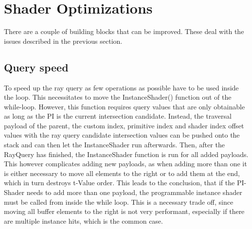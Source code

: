 \section{Shader Optimizations}
There are a couple of building blocks that can be improved. These deal with the issues described in the previous section.
\subsection{Query speed}
\label{sec:OptQuerySpeed}
To speed up the ray query as few operations as possible have to be used inside the loop. This necessitates to move the InstanceShader() function out of the while-loop. However, this function requires query values that are only obtainable as long as the PI is the current intersection candidate. Instead, the traversal payload of the parent, the custom index, primitive index and shader index offset values with the ray query candidate intersection values can be pushed onto the stack and can then let the InstanceShader run afterwards.
Then, after the RayQuery has finished, the InstanceShader function is run for all added payloads. This however complicates adding new payloads, as when adding more than one it is either necessary to move all elements to the right or to add them at the end, which in turn destroys t-Value order. This leads to the conclusion, that if the PI-Shader needs to add more than one payload, the programmable instance shader must be called from inside the while loop. This is a necessary trade off, since moving all buffer elements to the right is not very performant, especially if there are multiple instance hits, which is the common case.
